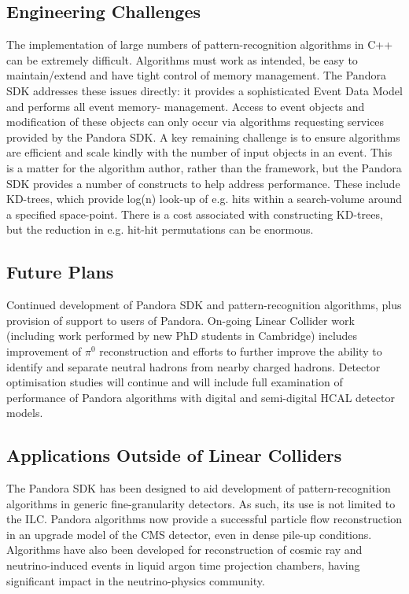 \subsection{Engineering Challenges}
The implementation of large numbers of pattern-recognition algorithms in C++ can
be extremely difficult. Algorithms must work as intended, be easy to
maintain/extend and have tight control of memory management. The Pandora SDK
addresses these issues directly: it provides a sophisticated Event Data Model
and performs all event memory- management. Access to event objects and
modification of these objects can only occur via algorithms requesting services
provided by the Pandora SDK. A key remaining challenge is to ensure algorithms
are efficient and scale kindly with the number of input objects in an event.
This is a matter for the algorithm author, rather than the framework, but the
Pandora SDK provides a number of constructs to help address performance. These
include KD-trees, which provide log(n) look-up of e.g. hits within a
search-volume around a specified space-point. There is a cost associated with
constructing KD-trees, but the reduction in e.g. hit-hit permutations can be
enormous.

\subsection{Future Plans}
Continued development of Pandora SDK and pattern-recognition algorithms, plus
provision of support to users of Pandora. On-going Linear Collider work
(including work performed by new PhD students in Cambridge) includes improvement
of $\pi^0$ reconstruction and efforts to further improve the ability to identify and
separate neutral hadrons from nearby charged hadrons. Detector optimisation
studies will continue and will include full examination of performance of
Pandora algorithms with digital and semi-digital HCAL detector models.

\subsection{Applications Outside of Linear Colliders}
The Pandora SDK has been designed to aid development of pattern-recognition
algorithms in generic fine-granularity detectors. As such, its use is not
limited to the ILC. Pandora algorithms now provide a successful particle flow
reconstruction in an upgrade model of the CMS detector, even in dense pile-up
conditions. Algorithms have also been developed for reconstruction of cosmic ray
and neutrino-induced events in liquid argon time projection chambers, having
significant impact in the neutrino-physics community.

